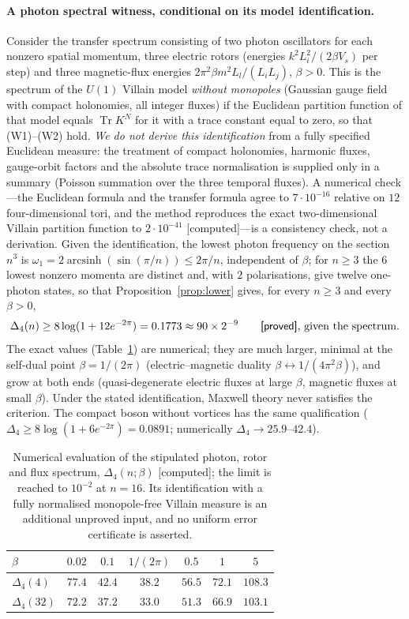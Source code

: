 \documentclass[11pt,a4paper]{article}
\theoremstyle{plain}
\theoremstyle{definition}
\theoremstyle{remark}
\numberwithin{equation}{section}
\newcommand{\Tr}{\operatorname{Tr}}
\newcommand{\st}[1]{\textsf{[#1]}}
\begin{document}
\paragraph{A photon spectral witness, conditional on its model identification.} Consider the transfer spectrum consisting of two photon
oscillators for each nonzero spatial momentum, three electric rotors (energies $k^2L_i^2/(2\beta V_s)$ per step) and three magnetic-flux energies
$2\pi^2\beta m^2L_l/(L_iL_j)$, $\beta>0$. This is the spectrum of the $U(1)$ Villain model \emph{without monopoles} (Gaussian gauge field with
compact holonomies, all integer fluxes) if the Euclidean partition function of that model equals $\Tr K^N$ for it with a trace constant equal
to zero, so that (W1)--(W2) hold. \emph{We do not derive this identification} from a fully specified Euclidean measure: the treatment of compact
holonomies, harmonic fluxes, gauge-orbit factors and the absolute trace normalisation is supplied only in a summary (Poisson summation over the
three temporal fluxes). A numerical check---the Euclidean formula and the transfer formula agree to $7\cdot10^{-16}$ relative on $12$ four-dimensional
tori, and the method reproduces the exact two-dimensional Villain partition function to $2\cdot10^{-41}$ \st{computed}---is a consistency
check, not a derivation. Given the identification, the lowest photon frequency on the section $n^3$ is $\omega_1=2\operatorname{arcsinh}(\sin(\pi/n))\le
2\pi/n$, independent of $\beta$; for $n\ge3$ the $6$ lowest nonzero momenta are distinct and, with $2$ polarisations, give twelve one-photon
states, so that Proposition~\ref{prop:lower} gives, for every $n\ge3$ and every $\beta>0$,
\[
\Delta_4(n)\ge8\log(1+12e^{-2\pi})=0.1773\approx90\times2^{-9}\qquad\text{\st{proved}, given the spectrum}.
\]
The exact values (Table~\ref{tab:maxwell}) are numerical; they are much larger, minimal at the self-dual point $\beta=1/(2\pi)$ (electric--magnetic
duality $\beta\leftrightarrow1/(4\pi^2\beta)$), and grow at both ends (quasi-degenerate electric fluxes at large $\beta$, magnetic fluxes at small
$\beta$). Under the stated identification, Maxwell theory never satisfies the criterion. The compact boson without vortices has the same
qualification ($\Delta_4\ge8\log(1+6e^{-2\pi})=0.0891$; numerically $\Delta_4\to25.9$--$42.4$).

\begin{table}[ht]
\centering\footnotesize
\begin{tabular}{@{}lcccccc@{}}
\toprule
$\beta$ & $0.02$ & $0.1$ & $1/(2\pi)$ & $0.5$ & $1$ & $5$\\
\midrule
$\Delta_4(4)$ & $77.4$ & $42.4$ & $38.2$ & $56.5$ & $72.1$ & $108.3$\\
$\Delta_4(32)$ & $72.2$ & $37.2$ & $33.0$ & $51.3$ & $66.9$ & $103.1$\\
\bottomrule
\end{tabular}
\caption{Numerical evaluation of the stipulated photon, rotor and flux spectrum, $\Delta_4(n;\beta)$ \st{computed}; the limit is reached to
$10^{-2}$ at $n=16$. Its identification with a fully normalised monopole-free Villain measure is an additional unproved input, and no uniform
error certificate is asserted.}
\label{tab:maxwell}
\end{table}
\end{document}
